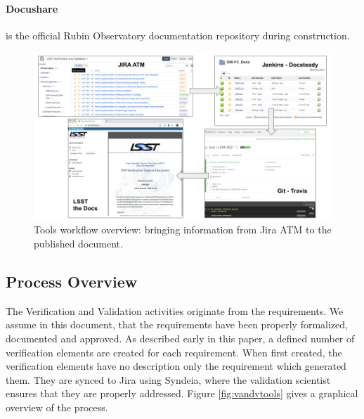 \paragraph{Docushare}
is the official Rubin Observatory documentation repository during construction.

\begin{figure}
\begin{center}
\includegraphics[width=\textwidth]{imgs/screenshots.png}
 \caption{Tools workflow overview: bringing information from Jira ATM to the published document.}
 \label{fig:overview}
\end{center}
\end{figure}


\subsection{Process Overview}\label{sec:proc}

The Verification and Validation activities originate from the requirements.
We assume in this document, that the requirements have been properly formalized, documented and approved.
As described early in this paper, a defined number of verification elements are created for each requirement.
When first created, the verification elements have no description only the requirement which generated them.
They are synced to Jira using Syndeia, where the validation scientist ensures that they are properly addressed.
Figure  \ref{fig:vandvtools} gives a graphical overview of the process.

